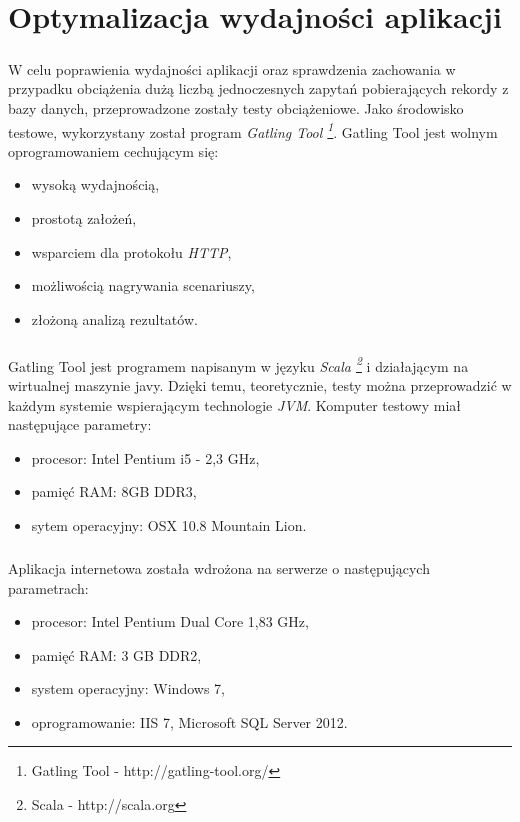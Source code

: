 \chapter{Optymalizacja wydajności aplikacji} %
\label{cha:wdra_anie}

\paragraph{} %
\label{par:}
W celu poprawienia wydajności aplikacji oraz sprawdzenia zachowania w przypadku obciążenia dużą liczbą jednoczesnych zapytań pobierających rekordy z bazy danych, przeprowadzone zostały testy obciążeniowe. Jako środowisko testowe, wykorzystany został program \textit{Gatling Tool \footnote{Gatling Tool - http://gatling-tool.org/}}. Gatling Tool jest wolnym oprogramowaniem cechującym się:
\begin{itemize}
 	\item wysoką wydajnością,
 	\item prostotą założeń,
 	\item wsparciem dla protokołu \textit{HTTP},
 	\item możliwością nagrywania scenariuszy,
 	\item złożoną analizą rezultatów.
 \end{itemize} 

\paragraph{} %
\label{par:}
Gatling Tool jest programem napisanym w języku \textit{Scala \footnote{Scala - http://scala.org}} i działającym na wirtualnej maszynie javy. Dzięki temu, teoretycznie, testy można przeprowadzić w każdym systemie wspierającym technologie \textit{JVM}. Komputer testowy miał następujące parametry:
\begin{itemize}
	\item procesor: Intel Pentium i5 - 2,3 GHz,
	\item pamięć RAM: 8GB DDR3,
	\item sytem operacyjny: OSX 10.8 Mountain Lion.
\end{itemize}

\paragraph{} %
 \label{par:}
 Aplikacja internetowa została wdrożona na serwerze o następujących parametrach:
 \begin{itemize}
 	\item procesor: Intel Pentium Dual Core 1,83 GHz,
 	\item pamięć RAM: 3 GB DDR2,
 	\item system operacyjny: Windows 7,
 	\item oprogramowanie: IIS 7, Microsoft SQL Server 2012.
 \end{itemize}


